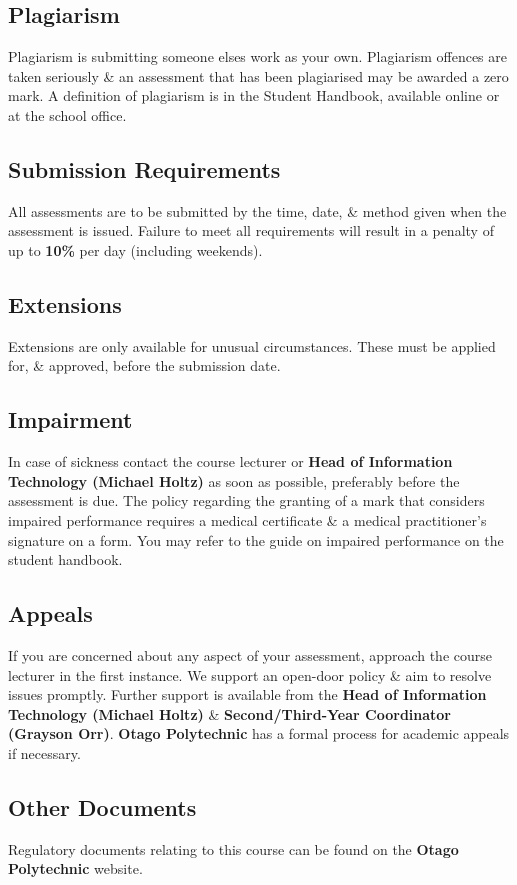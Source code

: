 \documentclass{article}
\begin{document}
\subsection*{Plagiarism}
Plagiarism is submitting someone elses work as your own. Plagiarism offences are taken seriously \& an assessment that has been plagiarised may be awarded a zero mark. A definition of plagiarism is in the Student Handbook, available online or at the school office.

\subsection*{Submission Requirements}
All assessments are to be submitted by the time, date, \& method given when the assessment is issued. Failure to meet all requirements will result in a penalty of up to \textbf{10\%} per day (including weekends).

\subsection*{Extensions}
Extensions are only available for unusual circumstances. These must be applied for, \& approved, before the submission date.

\subsection*{Impairment}
In case of sickness contact the course lecturer or \textbf{Head of Information Technology (Michael Holtz)} as soon as possible, preferably before the assessment is due. The policy regarding the granting of a mark that considers impaired performance requires a medical certificate \& a medical practitioner’s signature on a form. You may refer to the guide on impaired performance on the student handbook.

\subsection*{Appeals}
If you are concerned about any aspect of your assessment, approach the course lecturer in the first instance. We support an open-door policy \& aim to resolve issues promptly. Further support is available from the \textbf{Head of Information Technology (Michael Holtz)} \& \textbf{Second/Third-Year Coordinator (Grayson Orr)}. \textbf{Otago Polytechnic} has a formal process for academic appeals if necessary. 

\subsection*{Other Documents}
Regulatory documents relating to this course can be found on the \textbf{Otago Polytechnic} website. 
\end{document}
